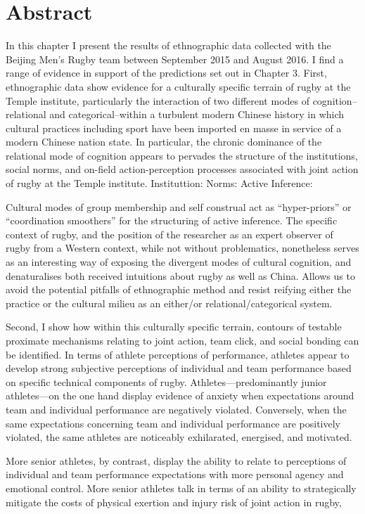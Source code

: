 
\section{Abstract}
In this chapter I present the results of ethnographic data collected with the Beijing Men's Rugby team between September 2015 and August 2016.  I find a range of evidence in support of the predictions set out in Chapter 3.  First, ethnographic data show evidence  for a culturally specific terrain of rugby at the Temple institute, particularly the interaction of two different modes of cognition--relational and categorical--within a turbulent modern Chinese history in which cultural practices including sport have been imported en masse in service of a modern Chinese nation state. In particular, the chronic dominance of the relational mode of cognition appears to pervades the structure of the institutions, social norms, and on-field action-perception processes associated with joint action of rugby at the Temple institute.  Instituttion:  Norms: Active Inference:

Cultural modes of group membership and self construal act as ``hyper-priors'' or ``coordination smoothers'' for the structuring of active inference.  The specific context of rugby, and the position of the researcher as an expert observer of rugby from a Western context, while not without problematics, nonetheless serves as an interesting way of exposing the divergent modes of cultural cognition, and denaturalises both received intuitions about rugby as well as China.  Allows us to avoid the potential pitfalls of ethnographic method and resist reifying either the practice or the cultural milieu as an either/or relational/categorical system.

Second, I show how within this culturally specific terrain, contours of testable proximate mechanisms relating to joint action, team click, and social bonding can be identified.   In terms of athlete perceptions of performance, athletes appear to develop strong subjective perceptions of individual and team performance based on specific technical components of rugby.   Athletes---predominantly junior athletes---on the one hand display evidence of anxiety when expectations around team and individual performance are negatively violated.  Conversely, when the same expectations concerning team and individual performance are positively violated, the same athletes are noticeably exhilarated, energised, and motivated.

More senior athletes, by contrast, display the ability to relate to perceptions of individual and team performance expectations with more personal agency and emotional control.  More senior athletes talk in terms of an ability to strategically mitigate the costs of physical exertion and injury risk of joint action in rugby,

